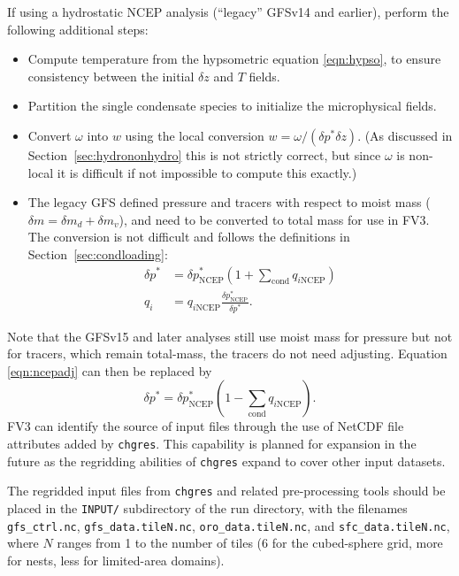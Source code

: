 \documentclass[10pt,letterpaper,margin=1in]{memoir}
\begin{document}
If using a hydrostatic NCEP analysis (``legacy'' GFSv14 and earlier), perform the following additional steps:
\begin{itemize}
\item Compute temperature from the hypsometric equation \eqref{eqn:hypso}, to ensure consistency between the initial $\delta z$ and $T$ fields. 
\item Partition the single condensate species to initialize the microphysical fields. 
\item Convert $\omega$ into $w$ using the local conversion $w = \omega/(\delta p^* \delta z)$. (As discussed in Section~\ref{sec:hydrononhydro} this is not strictly correct, but since $\omega$ is non-local it is difficult if not impossible to compute this exactly.)
\item The legacy GFS defined pressure and tracers with respect to moist mass ($\delta m = \delta m_d + \delta m_v$), and need to be converted to total mass for use in FV3. The conversion is not difficult and follows the definitions in Section~\ref{sec:condloading}:
\begin{align}
\delta p^* &= \delta p_\text{NCEP}^* \left ( 1 + \sum_\text{cond} q_{i\text{NCEP}} \right ) \label{eqn:ncepadj} \\
q_i &= q_{i\text{NCEP}}  \frac{\delta p_\text{NCEP}^*}{\delta p^*}.
\end{align}
\end{itemize}
Note that the GFSv15 and later analyses still use moist mass for pressure but not for tracers, which remain total-mass, the tracers do not need adjusting. Equation \eqref{eqn:ncepadj} can then be replaced by
\begin{equation}
\delta p^* = \delta p_\text{NCEP}^* \left ( 1 - \sum_\text{cond} q_{i\text{NCEP}} \right ) \label{eqn:ncepadj2}.
\end{equation}
FV3 can identify the source of input files through the use of NetCDF file attributes added by \texttt{chgres}. This capability is planned for expansion in the future as the regridding abilities of \texttt{chgres} expand to cover other input datasets.

The regridded input files from \texttt{chgres} and related pre-processing tools should be placed in the \texttt{INPUT/} subdirectory of the run directory, with the filenames \texttt{{gfs_ctrl.nc}}, \texttt{{gfs_data.tileN.nc}}, \texttt{{oro_data.tileN.nc}}, and \texttt{{sfc_data.tileN.nc}}, where $N$ ranges from 1 to the number of tiles (6 for the cubed-sphere grid, more for nests, less for limited-area domains).
\end{document}
